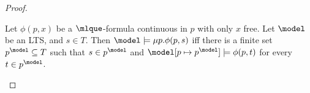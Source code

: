 \begin{proof}
\begin{proposition}\label{prop:cor_constructivity}
Let $\phi(p,x)$ be a $\mlque$-formula continuous in $p$ with only $x$
free. Let $\model$ be an LTS, and $s \in T$. Then
$\model \models \mu p. \phi(p,s)$ iff there is a finite set $p^\model \subseteq T$ such that $s\in p^\model$ and $\model[p\mapsto p^\model] \models \phi(p,t)$  for every $t \in p^\model$.
\end{proposition}
%

\end{proof}
